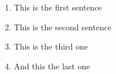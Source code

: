 \documentclass[dvips,a4paper,english]{article}
\begin{document}
\bigskip
\begin{LTXexample}[pos=t]
\begin{dogrid}[.75\linewidth][linecolor=lightgray,linestyle=solid,Gtrim=0 -1]
\begin{enumerate}
\item This is the first sentence
\item This is the second sentence
\item This is the third one
\item And this the last one
\end{enumerate}
\end{dogrid}
\end{LTXexample}


\nocite{*}
\bgroup
\raggedright


\egroup
\end{document}
